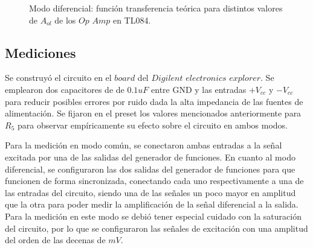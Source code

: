 \begin{figure}[H]
    \centering
    \hfill
    \caption{Modo diferencial: función transferencia teórica para distintos valores de $A_{ol}$ de los $Op$ $Amp$ en TL084.}
  \end{figure}

\subsection{Mediciones}

Se construyó el circuito en el $board$ del $Digilent$ $electronics$ $explorer$. Se emplearon dos capacitores de  de $0.1uF$ entre GND y las entradas $+V_{cc}$ y $-V_{cc}$ para reducir posibles errores por ruido dada la alta impedancia de las fuentes de alimentación. Se fijaron en el preset los valores mencionados anteriormente para $R_{5}$ para observar empíricamente su efecto sobre el circuito en ambos modos. 

Para la medición en modo común, se conectaron ambas entradas a la señal excitada por una de las salidas del generador de funciones. En cuanto al modo diferencial, se configuraron las dos salidas del generador de funciones para que funcionen de forma sincronizada, 
conectando cada uno respectivamente a una de las entradas del circuito, siendo una de las señales un poco mayor en amplitud que la otra para poder medir la amplificación de la señal diferencial a la salida. Para la medición en este modo
se debió tener especial cuidado con la saturación del circuito, por lo que se configuraron las señales de excitación con una amplitud del orden de las decenas de $mV$.


